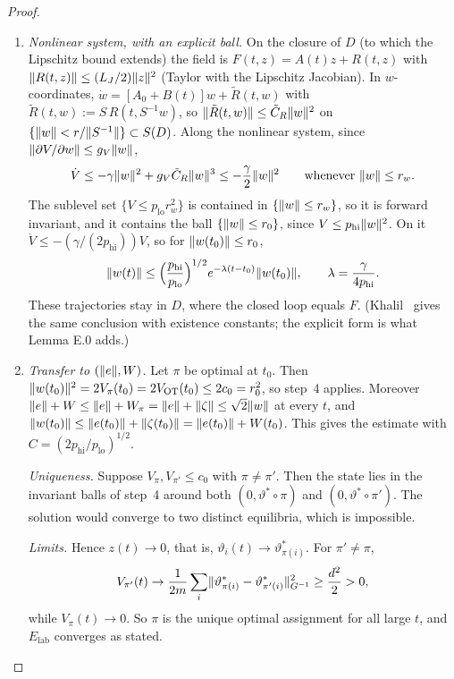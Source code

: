 \begin{proof}
\begin{enumerate}[label=\arabic*.]
  \item \emph{Nonlinear system, with an explicit ball.} On the closure of $D$ (to which the Lipschitz bound extends)
    the field is $F(t,z)=A(t)z+R(t,z)$ with $\lVert R(t,z)\rVert\le(L_J/2)\lVert z\rVert^2$ (Taylor with the Lipschitz
    Jacobian). In $w$-coordinates,
    $\dot w=[A_0+B(t)]w+\tilde R(t,w)$ with $\tilde R(t,w):=S\,R(t,S^{-1}w)$, so
    $\lVert \tilde R(t,w)\rVert\le\tilde C_R\lVert w\rVert^2$ on $\{\lVert w\rVert<r/\lVert S^{-1}\rVert\}\subset S(D)$. Along the nonlinear
    system, since $\lVert \partial V/\partial w\rVert\le g_V\lVert w\rVert$,
    \[
      \dot V\le-\gamma\lVert w\rVert^2+g_V\tilde C_R\lVert w\rVert^3\le-\frac{\gamma}{2}\lVert w\rVert^2
      \qquad\text{whenever }\lVert w\rVert\le r_w.
    \]
    The sublevel set $\{V\le p_{\mathrm{lo}}r_w^2\}$ is contained in $\{\lVert w\rVert\le r_w\}$, so it is forward
    invariant, and it contains the ball $\{\lVert w\rVert\le r_0\}$, since $V\le p_{\mathrm{hi}}\lVert w\rVert^2$. On it
    $\dot V\le-(\gamma/(2p_{\mathrm{hi}}))V$, so for $\lVert w(t_0)\rVert\le r_0$,
    \[
      \lVert w(t)\rVert\le\Bigl(\frac{p_{\mathrm{hi}}}{p_{\mathrm{lo}}}\Bigr)^{1/2}e^{-\lambda(t-t_0)}\lVert w(t_0)\rVert,
      \qquad\lambda=\frac{\gamma}{4p_{\mathrm{hi}}}.
    \]
    These trajectories stay in $D$, where the closed loop equals $F$. (Khalil~\cite[Thm.~4.13]{khalil2002} gives the
    same conclusion with existence constants; the explicit form is what Lemma E.0 adds.)

  \item \emph{Transfer to $(\lVert e\rVert,W)$.} Let $\pi$ be optimal at $t_0$. Then
    $\lVert w(t_0)\rVert^2=2V_\pi(t_0)=2V_{\mathrm{OT}}(t_0)\le2c_0=r_0^2$, so step~4 applies. Moreover
    $\lVert e\rVert+W\le\lVert e\rVert+W_\pi=\lVert e\rVert+\lVert \zeta\rVert\le\sqrt2\lVert w\rVert$ at every $t$, and
    $\lVert w(t_0)\rVert\le\lVert e(t_0)\rVert+\lVert \zeta(t_0)\rVert=\lVert e(t_0)\rVert+W(t_0)$. This gives the estimate with
    $C=(2p_{\mathrm{hi}}/p_{\mathrm{lo}})^{1/2}$.

    \emph{Uniqueness.} Suppose $V_\pi,V_{\pi'}\le c_0$ with $\pi\neq\pi'$. Then the state lies in the invariant balls
    of step~4 around both $(0,\vartheta^*\circ\pi)$ and $(0,\vartheta^*\circ\pi')$. The solution would converge to
    two distinct equilibria, which is impossible.

    \emph{Limits.} Hence $z(t)\to0$, that is, $\vartheta_i(t)\to\vartheta^*_{\pi(i)}$. For $\pi'\neq\pi$,
    \[
      V_{\pi'}(t)\to\frac1{2m}\sum_i\lVert \vartheta^*_{\pi(i)}-\vartheta^*_{\pi'(i)}\rVert^2_{G^{-1}}\ge\frac{d^2}2>0,
    \]
    while $V_\pi(t)\to0$. So $\pi$ is the unique optimal assignment for all large $t$, and $E_{\mathrm{lab}}$
    converges as stated.\qedhere
\end{enumerate}
\end{proof}
